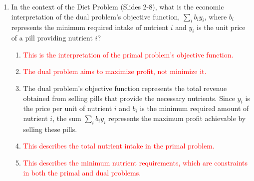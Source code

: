 \documentclass{article}%
\newcommand{\incorrect}[1]{\textcolor{red}{#1}}
\begin{document}
\begin{enumerate}
\begin{enumerate}%
\item The primal problem aims to minimize the total cost of the foods.  The cost of food 1 is 2 per unit, and the cost of food 2 is 3 per unit.  Therefore, the objective function is to minimize $2x_1 + 3x_2$, where $x_1$ and $x_2$ represent the amounts of food 1 and food 2 consumed, respectively.%
\item \incorrect{This objective function uses the minimum nutrient intake values ($b_i$) instead of the food costs ($c_j$).  The primal problem minimizes cost, not nutrient intake.}%
\item \incorrect{This is the objective function of the dual problem (maximizing profit from selling pills), not the primal problem.}%
\item \incorrect{This objective function incorrectly sums the amounts of food consumed without considering their respective costs.}%
\item \incorrect{This is the objective function of the dual problem, where $y_1$ and $y_2$ represent the prices of pills for nutrients.}%
\end{enumerate}%
\vspace{1em}%
\item In the context of the Diet Problem (Slides 2-8), what is the economic interpretation of the dual problem's objective function, $\sum_i b_i y_i$, where $b_i$ represents the minimum required intake of nutrient $i$ and $y_i$ is the unit price of a pill providing nutrient $i$?%
\begin{enumerate}%
\item \incorrect{This is the interpretation of the primal problem's objective function.}%
\item \incorrect{The dual problem aims to maximize profit, not minimize it.}%
\item The dual problem's objective function represents the total revenue obtained from selling pills that provide the necessary nutrients.  Since $y_i$ is the price per unit of nutrient $i$ and $b_i$ is the minimum required amount of nutrient $i$, the sum $\sum_i b_i y_i$ represents the maximum profit achievable by selling these pills.%
\item \incorrect{This describes the total nutrient intake in the primal problem.}%
\item \incorrect{This describes the minimum nutrient requirements, which are constraints in both the primal and dual problems.}%
\end{enumerate}%

\end{enumerate}
\end{document}
